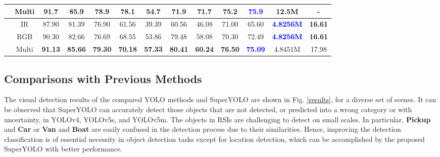 \begin{table*}[htpb]
{\begin{tabular}{c|c|c|c|c|c|c|c|c|c|c|c|c}
		& Multi & \textbf{91.7} & \textbf{85.9} & \textbf{78.9} & 78.1 & \textbf{54.7}& 71.9 & 71.7         &  75.2    & \textbf{\textcolor{blue}{75.9}}  & 12.5M &-\\
		\midrule
\textbf{\multirow{3}{*}{SuperYOLO}} & IR         & 87.90          & 81.39          & 76.90          & 61.56          & 39.39          & 60.56          & 46.08          & 71.00 & 65.60          & \textbf{\textcolor{blue}{4.8256M}}  & \textbf{16.61}\\
		& RGB        & 90.30          & 82.66 & 76.69          & 68.55          & 53.86          & 79.48 & 58.08          & 70.30          & 72.49         & \textbf{\textcolor{blue}{4.8256M}}  & \textbf{16.61}\\
& Multi & \textbf{91.13} & \textbf{85.66}        & \textbf{79.30} & \textbf{70.18} & \textbf{57.33} & \textbf{80.41}        & \textbf{60.24} & \textbf{76.50}          & \textbf{\textcolor{blue}{75.09}} & 4.8451M  & 17.98 \\
		\bottomrule[1.2pt]
	\end{tabular}}
\vspace{-0.1in}
\end{table*}
 








\subsection{Comparisons with Previous Methods}
The visual detection results of the compared YOLO methods and SuperYOLO are shown in Fig. \ref{results}, for a diverse set of scenes. It can be observed that SuperYOLO can accurately detect those objects that are not detected, or predicted into a wrong category or with uncertainty, in YOLOv4, YOLOv5s, and YOLOv5m. The objects in RSIs are challenging to detect on small scales. In particular, \textbf{Pickup} and \textbf{Car} or \textbf{Van} and \textbf{Boat} are easily confused in the detection process due to their similarities. Hence, improving the detection classification is of essential necessity in object detection tasks except for location detection, which can be accomplished by the proposed SuperYOLO with better performance. 


